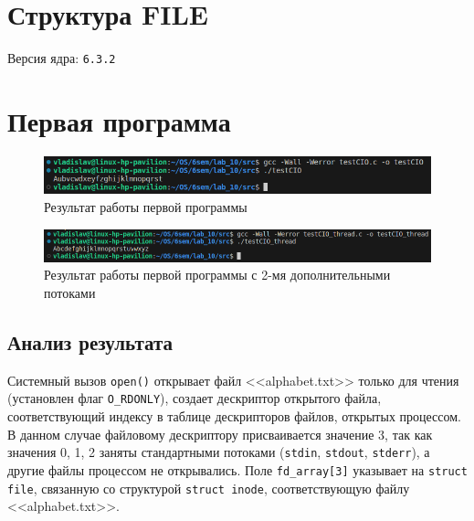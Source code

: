 \section{Структура FILE}

Версия ядра: \texttt{6.3.2}

\captionsetup{singlelinecheck = false, justification=raggedright}


\captionsetup{singlelinecheck = false, justification=raggedright}


\section{Первая программа}

\captionsetup{singlelinecheck = false, justification=raggedright}


\begin{figure}[ht]
	\centering
	\includegraphics[width=\textwidth]{img/1-1}
	\caption{Результат работы первой программы}
\end{figure}

\captionsetup{singlelinecheck = false, justification=raggedright}


\begin{figure}[ht]
	\centering
	\includegraphics[width=\textwidth]{img/1-2.png}
	\caption{Результат работы первой программы с 2-мя дополнительными потоками}
\end{figure}

\subsection{Анализ результата}

Системный вызов \texttt{open()} открывает файл <<alphabet.txt>> только для чтения
(установлен флаг \texttt{O\_RDONLY}), создает дескриптор открытого файла, соответствующий
индексу в таблице дескрипторов файлов, открытых процессом.  В данном случае
файловому дескриптору присваивается значение 3, так как значения 0, 1, 2 заняты стандартными потоками (\texttt{stdin}, \texttt{stdout},
\texttt{stderr}), а другие файлы процессом не открывались. Поле
\texttt{fd\_array[3]} указывает на \texttt{struct file}, связанную со структурой \texttt{struct inode}, соответствующую файлу <<alphabet.txt>>.

